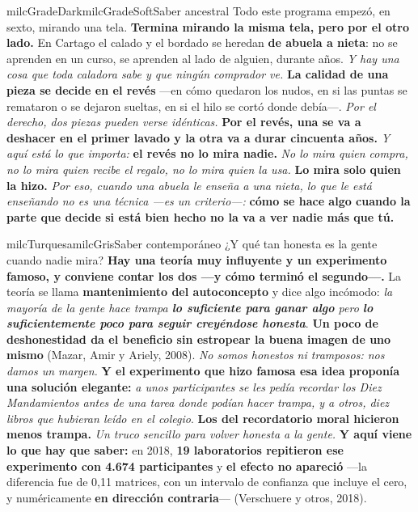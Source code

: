 \documentclass[11pt,letterpaper]{article}
\begin{document}
\begin{softbox}{milcGradeDark}{milcGradeSoft}{Saber ancestral}
Todo este programa empezó, en sexto, mirando una tela. \textbf{Termina mirando la misma tela, pero por el otro lado.} En Cartago el calado y el bordado se heredan \textbf{de abuela a nieta}: no se aprenden en un curso, se aprenden al lado de alguien, durante años. \emph{Y hay una cosa que toda caladora sabe y que ningún comprador ve.} \textbf{La calidad de una pieza se decide en el revés} ---en cómo quedaron los nudos, en si las puntas se remataron o se dejaron sueltas, en si el hilo se cortó donde debía---. \emph{Por el derecho, dos piezas pueden verse idénticas.} \textbf{Por el revés, una se va a deshacer en el primer lavado y la otra va a durar cincuenta años.} \emph{Y aquí está lo que importa:} \textbf{el revés no lo mira nadie.} \emph{No lo mira quien compra, no lo mira quien recibe el regalo, no lo mira quien la usa.} \textbf{Lo mira solo quien la hizo.} \emph{Por eso, cuando una abuela le enseña a una nieta, lo que le está enseñando no es una técnica ---es un criterio---:} \textbf{cómo se hace algo cuando la parte que decide si está bien hecho no la va a ver nadie más que tú.}
\end{softbox}

\begin{softbox}{milcTurquesa}{milcGris}{Saber contemporáneo}
¿Y qué tan honesta es la gente cuando nadie mira? \textbf{Hay una teoría muy influyente y un experimento famoso, y conviene contar los dos ---y cómo terminó el segundo---.} La teoría se llama \textbf{mantenimiento del autoconcepto} y dice algo incómodo: \emph{la mayoría de la gente hace trampa \textbf{lo suficiente para ganar algo} pero \textbf{lo suficientemente poco para seguir creyéndose honesta}}. \textbf{Un poco de deshonestidad da el beneficio sin estropear la buena imagen de uno mismo} (Mazar, Amir y Ariely, 2008). \emph{No somos honestos ni tramposos: nos damos un margen.} \textbf{Y el experimento que hizo famosa esa idea proponía una solución elegante:} \emph{a unos participantes se les pedía recordar los Diez Mandamientos antes de una tarea donde podían hacer trampa, y a otros, diez libros que hubieran leído en el colegio}. \textbf{Los del recordatorio moral hicieron menos trampa.} \emph{Un truco sencillo para volver honesta a la gente.} \textbf{Y aquí viene lo que hay que saber:} en 2018, \textbf{19 laboratorios repitieron ese experimento con 4.674 participantes} y \textbf{el efecto no apareció} ---la diferencia fue de 0,11 matrices, con un intervalo de confianza que incluye el cero, y numéricamente \textbf{en dirección contraria}--- (Verschuere y otros, 2018).
\end{softbox}
\end{document}
